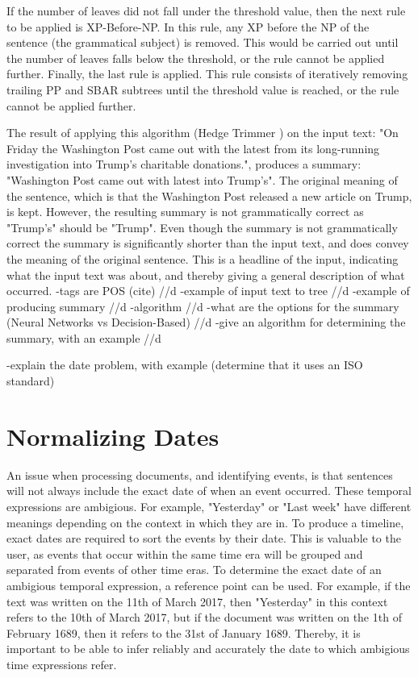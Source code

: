 \par If the number of leaves did not fall under the threshold value, then the next rule to be applied is XP-Before-NP. In this rule, any XP before the NP of the sentence (the grammatical subject) is removed. This would be carried out until the number of leaves falls below the threshold, or the rule cannot be applied further. Finally, the last rule is applied.  This rule consists of iteratively removing trailing PP and SBAR subtrees until the threshold value is reached, or the rule cannot be applied further. 
\par The result of applying this algorithm (Hedge Trimmer  \cite{dorrzajicschwartz2003}) on the input text: "On Friday the Washington Post came out with the latest from its long-running investigation into Trump's charitable donations.", produces a summary: "Washington Post came out with latest into Trump's". The original meaning of the sentence, which is that the Washington Post released a new article on Trump, is kept. However, the resulting summary is not grammatically correct as "Trump's" should be "Trump". Even though the summary is not grammatically correct the summary is significantly shorter than the input text, and does convey the meaning of the original sentence. This is a headline of the input, indicating what the input text was about, and thereby giving a general description of what occurred.
-tags are POS (cite) //d
-example of input text to tree //d
-example of producing summary //d 
-algorithm //d 
-what are the options for the summary (Neural Networks vs Decision-Based) //d
-give an algorithm for determining the summary, with an example //d

-explain the date problem, with example (determine that it uses an ISO standard)
\section{Normalizing Dates}
\par An issue when processing documents, and identifying events, is that sentences will not always include the exact date of when an event occurred. These temporal expressions are ambigious. For example, "Yesterday" or "Last week" have different meanings depending on the context in which they are in. To produce a timeline, exact dates are required to sort the events by their date. This is valuable to the user, as events that occur within the same time era will be grouped and separated from events of other time eras. To determine the exact date of an ambigious temporal expression, a reference point can be used. For example, if the text was written on the 11th of March 2017, then "Yesterday" in this context refers to the 10th of March 2017, but if the document was written on the 1th of February 1689, then it refers to the 31st of January 1689. Thereby, it is important to be able to infer reliably and accurately the date to which ambigious time expressions refer. 

